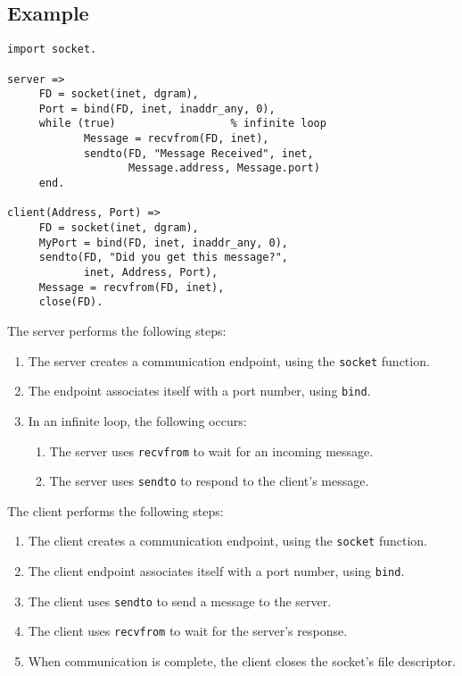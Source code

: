 \subsection*{Example}
\begin{verbatim}
import socket.

server =>
     FD = socket(inet, dgram),
     Port = bind(FD, inet, inaddr_any, 0),
     while (true)                  % infinite loop
            Message = recvfrom(FD, inet), 
            sendto(FD, "Message Received", inet, 
                   Message.address, Message.port)
     end.

client(Address, Port) =>
     FD = socket(inet, dgram),
     MyPort = bind(FD, inet, inaddr_any, 0),
     sendto(FD, "Did you get this message?", 
            inet, Address, Port),
     Message = recvfrom(FD, inet),
     close(FD). 
\end{verbatim}

The server performs the following steps:
\begin{enumerate}
\item The server creates a communication endpoint, using the \texttt{socket} function.
\item The endpoint associates itself with a port number, using \texttt{bind}.
\item In an infinite loop, the following occurs:
\begin{enumerate}
\item The server uses \texttt{recvfrom} to wait for an incoming message.
\item The server uses \texttt{sendto} to respond to the client's message.
\end{enumerate}
\end{enumerate}

The client performs the following steps:
\begin{enumerate}
\item The client creates a communication endpoint, using the \texttt{socket} function.
\item The client endpoint associates itself with a port number, using \texttt{bind}.
\item The client uses \texttt{sendto} to send a message to the server.
\item The client uses \texttt{recvfrom} to wait for the server's response.
\item When communication is complete, the client closes the socket's file descriptor.
\end{enumerate}

